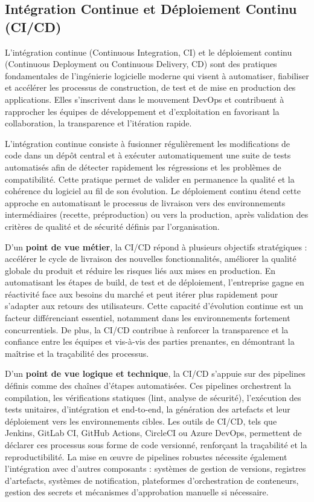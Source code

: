 \subsection{Intégration Continue et Déploiement Continu (CI/CD)}

L’intégration continue (Continuous Integration, CI) et le déploiement continu (Continuous Deployment ou Continuous Delivery, CD) sont des pratiques fondamentales de l’ingénierie logicielle moderne qui visent à automatiser, fiabiliser et accélérer les processus de construction, de test et de mise en production des applications. Elles s’inscrivent dans le mouvement DevOps et contribuent à rapprocher les équipes de développement et d’exploitation en favorisant la collaboration, la transparence et l’itération rapide.

L’intégration continue consiste à fusionner régulièrement les modifications de code dans un dépôt central et à exécuter automatiquement une suite de tests automatisés afin de détecter rapidement les régressions et les problèmes de compatibilité. Cette pratique permet de valider en permanence la qualité et la cohérence du logiciel au fil de son évolution. Le déploiement continu étend cette approche en automatisant le processus de livraison vers des environnements intermédiaires (recette, préproduction) ou vers la production, après validation des critères de qualité et de sécurité définis par l’organisation.

D’un \textbf{point de vue métier}, la CI/CD répond à plusieurs objectifs stratégiques : accélérer le cycle de livraison des nouvelles fonctionnalités, améliorer la qualité globale du produit et réduire les risques liés aux mises en production. En automatisant les étapes de build, de test et de déploiement, l’entreprise gagne en réactivité face aux besoins du marché et peut itérer plus rapidement pour s’adapter aux retours des utilisateurs. Cette capacité d’évolution continue est un facteur différenciant essentiel, notamment dans les environnements fortement concurrentiels. De plus, la CI/CD contribue à renforcer la transparence et la confiance entre les équipes et vis-à-vis des parties prenantes, en démontrant la maîtrise et la traçabilité des processus.

D’un \textbf{point de vue logique et technique}, la CI/CD s’appuie sur des pipelines définis comme des chaînes d’étapes automatisées. Ces pipelines orchestrent la compilation, les vérifications statiques (lint, analyse de sécurité), l’exécution des tests unitaires, d’intégration et end-to-end, la génération des artefacts et leur déploiement vers les environnements cibles. Les outils de CI/CD, tels que Jenkins, GitLab CI, GitHub Actions, CircleCI ou Azure DevOps, permettent de déclarer ces processus sous forme de code versionné, renforçant la traçabilité et la reproductibilité. La mise en œuvre de pipelines robustes nécessite également l’intégration avec d’autres composants : systèmes de gestion de versions, registres d’artefacts, systèmes de notification, plateformes d’orchestration de conteneurs, gestion des secrets et mécanismes d’approbation manuelle si nécessaire.

